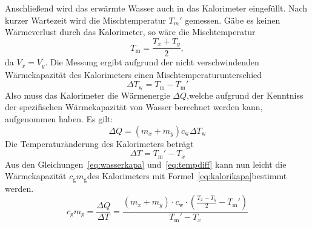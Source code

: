 Anschließend wird das erwärmte Wasser auch in das Kalorimeter eingefüllt.
Nach kurzer Wartezeit wird die Mischtemperatur $T_m'$ gemessen.
Gäbe es keinen Wärmeverlust durch das Kalorimeter, so wäre die Mischtemperatur
\begin{equation}
\label{eq:mischtemp1}
T_\text{m} = \frac{T_x + T_y}{2},
\end{equation}
da $V_x = V_y$.
Die Messung ergibt aufgrund der nicht verschwindenden Wärmekapazität 
des Kalorimeters einen Mischtemperaturunterschied 
\begin{equation}
\label{eq:mischtemp2}
\Delta T_\text{w} = T_\text{m} - T_\text{m}'
\end{equation}
Also muss das Kalorimeter die Wärmenergie $\Delta Q$,welche aufgrund 
der Kenntniss der spezifischen Wärmekapazität von Wasser berechnet 
werden kann, aufgenommen haben.
Es gilt:
\begin{equation}
\label{eq:wasserkapa}
\Delta Q = (m_x + m_y)c_\text{w}\Delta T_\text{w}
\end{equation}
%
Die Temperaturänderung des Kalorimeters beträgt 
\begin{equation}
\label{eq:tempdiff}
\Delta T = T_\text{m}' - T_x
\end{equation}
Aus den Gleichungen~\eqref{eq:wasserkapa} und~\eqref{eq:tempdiff} 
kann nun leicht die Wärmekapazität $c_\text{g}m_\text{g}$des Kalorimeters 
 mit Formel~\eqref{eq:kalorikapa}bestimmt werden. 
%
\begin{equation}
\label{eq:kalorikapa}
c_\text{g}m_\text{g} =\frac{\Delta Q}{\Delta T} = \frac{(m_x +m_y)\cdot c_\text{w}\cdot\left(\frac{T_x - T_y}{2} - T_\text{m}'\right)}{T_\text{m}' - T_x}
\end{equation}